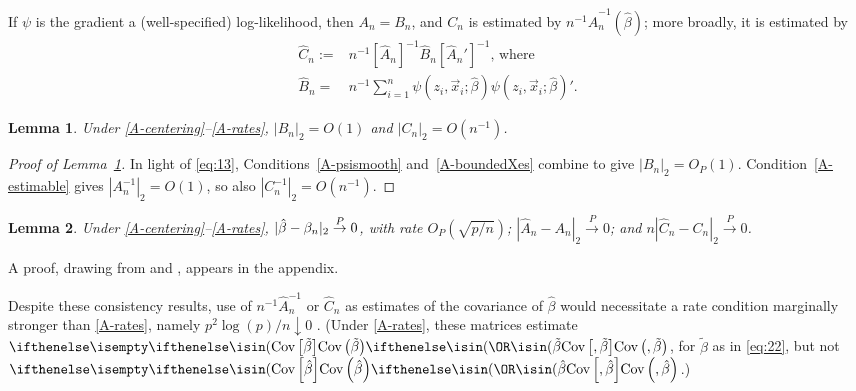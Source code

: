 \documentclass{article}
\newtheorem{lemma}{Lemma}
\theoremstyle{remark}
\begin{document}
If $\psi$ is the gradient a (well-specified) log-likelihood, then $A_{n}=B_{n}$, and $C_{n}$ is estimated by $n^{-1}\hat{A}_{n}^{-1}(\hat\beta)$; more broadly, it is estimated by 
\begin{align*}
\hat{C}_{n} :=& n^{-1} [\hat{A}_{n}]^{-1} \hat{B}_{n} [\hat{A}_{n}']^{-1},\, \text{where}\\
\hat{B}_{n}  =&  n^{-1} \sum_{i=1}^{n} \psi(z_{i}, \vec{x}_{i};  \hat{\beta} ) \psi(z_{i}, \vec{x}_{i};  \hat{\beta} )'.  
\end{align*}

\begin{lemma} \label{lem:C-rate}
  Under \ref{A-centering}--\ref{A-rates}, $|B_{n}|_{2} = O(1)$ and $|C_{n}|_{2} = O(n^{-1})$.
\end{lemma}

\begin{proof}[Proof of Lemma~\ref{lem:C-rate}]
  In light of \eqref{eq:13}, Conditions~\ref{A-psismooth} and~\ref{A-boundedXes}%
 combine to give $|B_{n}|_{2} = O_{P}(1)$.  Condition~\ref{A-estimable} gives $|{A}_{n}^{-1}|_{2}=O(1)$, so also $|{C}_{n}^{-1}|_{2}=O(n^{-1})$.
\end{proof}


\begin{lemma} \label{lem:ChatC}
  Under \ref{A-centering}--\ref{A-rates}, $|\hat\beta - \beta_{n }|_{2} \stackrel{P}{\rightarrow} 0$, with rate $O_{P}\left( \sqrt{p/n} \right)$;   $|\hat{A}_{n} - A_{n}|_{2} \stackrel{P}{\rightarrow} 0$; and $n|\hat{C}_{n} - C_{n}|_{2} \stackrel{P}{\rightarrow} 0$. 
\end{lemma}

A proof, drawing from \citet{he2000parameters} and \citet{wang2011gee}, appears in the appendix.

Despite these consistency results, use of $n^{-1}\hat{A}_{n}^{-1}$ or
$\hat{C}_{n}$ as estimates of the covariance of $\hat\beta$ would
necessitate a rate condition marginally stronger than \ref{A-rates}, namely $p^{2}\log(p)/n \downarrow 0$ \citep[Theorem~2.2]{he2000parameters}. (Under \ref{A-rates}, these matrices estimate $\Cov{\tilde{\beta}}$, for $\tilde\beta$ as in \eqref{eq:22}, but not $\Cov{\hat\beta}$.)
\end{document}
